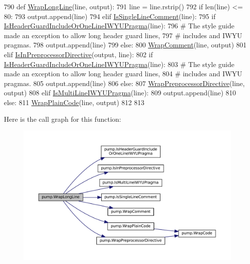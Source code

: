 \begin{DoxyCode}
790 \textcolor{keyword}{def }\hyperlink{namespacepump_a02427e2ddc80f0f408e27dfc3e38e702}{WrapLongLine}(line, output):
791   line = line.rstrip()
792   \textcolor{keywordflow}{if} len(line) <= 80:
793     output.append(line)
794   \textcolor{keywordflow}{elif} \hyperlink{namespacepump_a417078b1d036b67756c47e5dc50324dc}{IsSingleLineComment}(line):
795     \textcolor{keywordflow}{if} \hyperlink{namespacepump_ac8a553b60dc83d100361a0e98d98451b}{IsHeaderGuardIncludeOrOneLineIWYUPragma}(line):
796       \textcolor{comment}{# The style guide made an exception to allow long header guard lines,}
797       \textcolor{comment}{# includes and IWYU pragmas.}
798       output.append(line)
799     \textcolor{keywordflow}{else}:
800       \hyperlink{namespacepump_a73951c98652038351b1cd24291433e12}{WrapComment}(line, output)
801   \textcolor{keywordflow}{elif} \hyperlink{namespacepump_aa33101b01d5781710262f3b5dadd8bc8}{IsInPreprocessorDirective}(output, line):
802     \textcolor{keywordflow}{if} \hyperlink{namespacepump_ac8a553b60dc83d100361a0e98d98451b}{IsHeaderGuardIncludeOrOneLineIWYUPragma}(line):
803       \textcolor{comment}{# The style guide made an exception to allow long header guard lines,}
804       \textcolor{comment}{# includes and IWYU pragmas.}
805       output.append(line)
806     \textcolor{keywordflow}{else}:
807       \hyperlink{namespacepump_a59e8ae06bae068d2d72df4f0340635d8}{WrapPreprocessorDirective}(line, output)
808   \textcolor{keywordflow}{elif} \hyperlink{namespacepump_a707a3ff4514c89607e48a87589aed787}{IsMultiLineIWYUPragma}(line):
809     output.append(line)
810   \textcolor{keywordflow}{else}:
811     \hyperlink{namespacepump_a60723738cc38d8ced7e2cfecc72d8b11}{WrapPlainCode}(line, output)
812 
813 
\end{DoxyCode}
Here is the call graph for this function\+:
\nopagebreak
\begin{figure}[H]
\begin{center}
\leavevmode
\includegraphics[width=350pt]{namespacepump_a02427e2ddc80f0f408e27dfc3e38e702_cgraph}
\end{center}
\end{figure}
